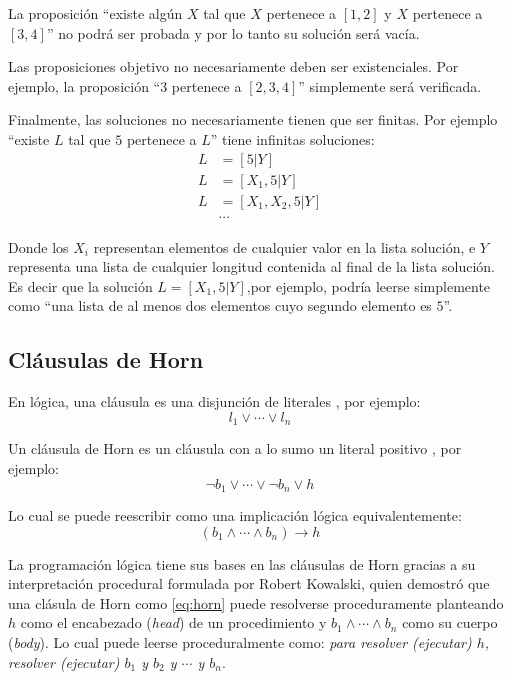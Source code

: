 \documentclass[12pt,titlepage]{article}
\begin{document}
La proposición ``existe algún $X$ tal que $X$ pertenece a $[1, 2]$ y $X$ pertenece a $[3, 4]$'' no podrá ser probada y por lo tanto su solución será vacía.

Las proposiciones objetivo no necesariamente deben ser existenciales. Por ejemplo, la proposición ``$3$ pertenece a $[2,3,4]$'' simplemente será verificada.

Finalmente, las soluciones no necesariamente tienen que ser finitas. Por ejemplo ``existe $L$ tal que $5$ pertenece a $L$'' tiene infinitas soluciones:
\begin{align*}
L& =[5|Y] \\
L& =[X_1, 5|Y] \\
L& =[X_1,X_2,5|Y] \\
 & \cdots
\end{align*}

Donde los $X_i$ representan elementos de cualquier valor en la lista solución, e $Y$ representa una lista de cualquier longitud contenida al final de la lista solución. Es decir que la solución $L=[X_1,5|Y]$,por ejemplo, podría leerse simplemente como ``una lista de al menos dos elementos cuyo segundo elemento es $5$''.

\subsection{Cláusulas de Horn}
\label{sec:horn}

En lógica, una cláusula es una disjunción de literales \cite{clausula}, por ejemplo:
\[
l_1 \lor \cdots \lor l_n
\]

Un cláusula de Horn es un cláusula con a lo sumo un literal positivo \cite{horn_clauses}, por ejemplo:
\[
\lnot b_1 \lor \cdots \lor \lnot b_n \lor h
\]

Lo cual se puede reescribir como una implicación lógica equivalentemente:
\begin{equation} \label{eq:horn}
(b_1 \land \cdots \land b_n) \rightarrow h
\end{equation}

La programación lógica tiene sus bases en las cláusulas de Horn gracias a su interpretación procedural formulada por Robert Kowalski, quien demostró que una clásula de Horn como \eqref{eq:horn} puede resolverse proceduramente \cite{kowalski} planteando $h$ como el encabezado (\emph{head}) de un procedimiento y $b_1 \land \cdots \land b_n$ como su cuerpo (\emph{body}). Lo cual puede leerse proceduralmente como: \emph{para resolver (ejecutar) $h$, resolver (ejecutar) $b_1$ y $b_2$ y $\cdots$ y $b_n$}. 
\end{document}
